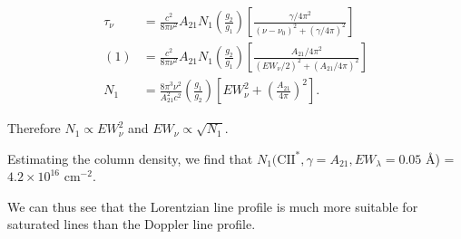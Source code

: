 \documentclass[12pt]{article}
\begin{document}
\begin{equation*}
\begin{split}
\tau_\nu &= \frac{c^2}{8\pi\nu^2}A_{21}N_1\left(\frac{g_2}{g_1}\right)\left[\frac{\gamma/4\pi^2}{(\nu-\nu_0)^2 + (\gamma/4\pi)^2}\right]\\
(1) &= \frac{c^2}{8\pi\nu^2}A_{21}N_1\left(\frac{g_2}{g_1}\right)\left[\frac{A_{21}/4\pi^2}{(EW_\nu/2)^2 + (A_{21}/4\pi)^2}\right]\\
N_1 &= \frac{8\pi^3\nu^2}{A_{21}^2c^2}\left(\frac{g_1}{g_2}\right)\left[EW_\nu^2 + \left(\frac{A_{21}}{4\pi}\right)^2\right].
\end{split}
\end{equation*}

Therefore $N_1 \propto EW_\nu^2$ and $EW_\nu \propto \sqrt{N_1}$.

Estimating the column density, we find that $N_1(\mathrm{CII^*},\gamma=A_{21},EW_\lambda=0.05$ \AA) = $4.2 \times 10^{16}$ cm$^{-2}$.

We can thus see that the Lorentzian line profile is much more suitable for saturated lines than the Doppler line profile.
\end{document}

